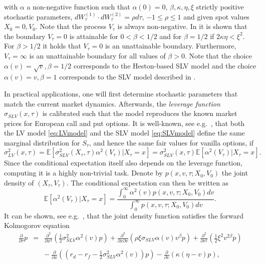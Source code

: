 \documentclass[10pt]{article}
\begin{document}
with $\alpha$ a non-negative function such that $\alpha(0)=0$, $\beta, \kappa, \eta, \xi$ strictly positive stochastic parameters, $dW^{(1)}_{\tau} \cdot dW^{(2)}_{\tau} = \rho d\tau$, $-1 \leq \rho \leq 1$ and given spot values $X_{0}=0, V_{0}$. Note that the process $V_{\tau}$ is always non-negative. In \cite{AP06} it is shown that the boundary $V_{\tau}=0$ is attainable for $0<\beta<1/2$ and for $\beta=1/2$ if $2\kappa \eta < \xi^2$. For $\beta>1/2$ it holds that $V_{\tau}=0$ is an unattainable boundary. Furthermore, $V_{\tau} = \infty$ is an unattainable boundary for all values of $\beta>0$.
Note that the choice $\alpha(v)=\sqrt{v}, \beta = 1/2$ corresponds to the Heston-based SLV model and the choice $\alpha(v)=v, \beta = 1$ corresponds to the SLV model described in \cite{TF10}.

In practical applications, one will first determine stochastic parameters that match the current market dynamics. Afterwards, the \textit{leverage function} $\sigma_{SLV} (x,\tau)$ is calibrated such that the model reproduces the known market prices for European call and put options.
It is well-known, see e.g.\ \cite{G86,T11}, that both the LV model \eqref{eq:LVmodel} and the SLV model \eqref{eq:SLVmodel} define the same marginal distribution for $S_{\tau}$, and hence the same fair values for vanilla options, if
\begin{equation}
\sigma^{2}_{LV} (x,\tau) = \mathbb{E}[\sigma_{SLV}^{2} (X_{\tau},\tau)\alpha^{2}(V_{\tau}) \vert X_{\tau} = x] = \sigma_{SLV}^{2} (x,\tau)\mathbb{E}[\alpha^{2}(V_{\tau}) \vert X_{\tau} = x].
\label{eq:SigmatoMatch}
\end{equation}
Since the conditional expectation itself also depends on the leverage function, computing it is a highly non-trivial task. Denote by $p(x,v,\tau;X_{0},V_{0})$ the joint density of $(X_{\tau},V_{\tau})$. The conditional expectation can then be written as
\begin{equation}
\mathbb{E}[\alpha^{2}(V_{\tau}) \vert X_{\tau} = x] = \frac{\int_{0}^{\infty} \alpha^{2}(v) p(x,v,\tau;X_{0},V_{0})dv}{\int_{0}^{\infty} p(x,v,\tau;X_{0},V_{0})dv}.
\label{eq:CondExpec}
\end{equation}
It can be shown, see e.g.\ \cite{C11}, that the joint density function satisfies the forward Kolmogorov equation
\begin{equation}
\begin{array}{lll}
\tfrac{\partial}{\partial \tau} p &=& \tfrac{\partial^{2}}{\partial x^{2}} \left( \tfrac{1}{2} \sigma^{2}_{SLV}\alpha^{2}(v)p \right) + \tfrac{\partial^{2}}{\partial x \partial v} \left( \rho \xi \sigma_{SLV}\alpha(v)v^{\beta} p \right) + \tfrac{\partial^{2}}{\partial v^{2}} \left( \tfrac{1}{2} \xi^{2} v^{2\beta} p \right) \\\\
&& - \ \tfrac{\partial}{\partial x} \left( (r_{d}-r_{f}-\tfrac{1}{2}\sigma^{2}_{SLV}\alpha^{2}(v)) p \right) - \tfrac{\partial}{\partial v} \left( \kappa(\eta - v) p \right),
\end{array}
\label{eq:ForwardKolmogorov}
\end{equation}
\end{document}
